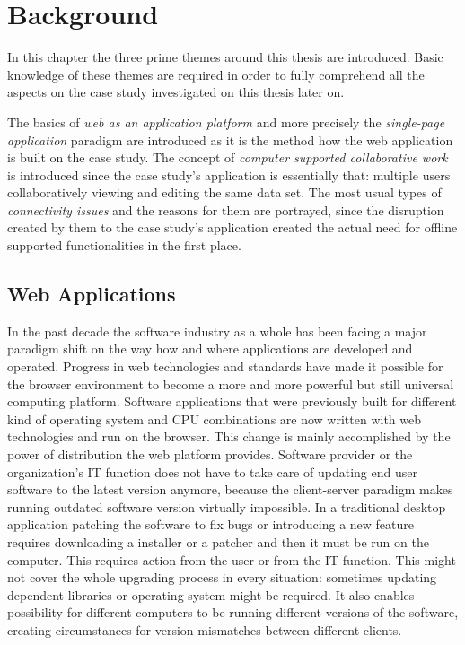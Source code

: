 \chapter{Background}

In this chapter the three prime themes around this thesis are introduced. Basic knowledge of these themes are required in order to fully comprehend all the aspects on the case study investigated on this thesis later on. 

The basics of \textit{web as an application platform} and more precisely the \textit{single-page application} paradigm are introduced as it is the method how the web application is built on the case study. The concept of \textit{computer supported collaborative work} is introduced since the case study's application is essentially that: multiple users collaboratively viewing and editing the same data set. The most usual types of \textit{connectivity issues} and the reasons for them are portrayed, since the disruption created by them to the case study's application created the actual need for offline supported functionalities in the first place. 




\section{Web Applications}

In the past decade the software industry as a whole has been facing a major paradigm shift on the way how and where applications are developed and operated. Progress in web technologies and standards have made it possible for the browser environment to become a more and more powerful but still universal computing platform. Software applications that were previously built for different kind of operating system and CPU combinations are now written with web technologies and run on the browser. This change is mainly accomplished by the power of distribution the web platform provides. Software provider or the organization's IT function does not have to take care of updating end user software to the latest version anymore, because the client-server paradigm\cite{berson_client-server_1992} makes running outdated software version virtually impossible. In a traditional desktop application patching the software to fix bugs or introducing a new feature requires downloading a installer or a patcher and then it must be run on the computer. This requires action from the user or from the IT function. This might not cover the whole upgrading process in every situation: sometimes updating dependent libraries or operating system might be required. It also enables possibility for different computers to be running different versions of the software, creating circumstances for version mismatches between different clients. \cite{jazayeri_trends_????} \cite{taivalsaari_mashware:_2009} %

